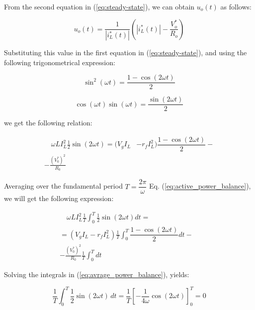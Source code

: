 \documentclass[DIV=calc, paper=a4, fontsize=11pt, twocolumn]{scrartcl}	 %
\begin{document}
From the second equation in (\ref{eq:steady-state}), we can obtain $u_o(t)$ as follows:

{\small
\begin{equation} \label{eq:steady_state_control}
u_o(t)= \dfrac{1}{|i^*_L(t)|}(|i^*_L(t)|- \dfrac{V^*_{o}}{R_o})
\end{equation}
}


Substituting this value in the first equation in (\ref{eq:steady-state}), and using the following trigonometrical expression:

\begin{equation}\label{eq:sin2wt}
\sin^2(\omega t) = \dfrac{1-\cos(2\omega t)}{2}
\end{equation}

\begin{equation}\label{eq:cossin}
\cos(\omega t)\sin(\omega t) = \dfrac{\sin(2\omega t)}{2}
\end{equation}

we get the following relation:

{\small
\begin{equation}\label{eq:active_power_balance}
\begin{split}
\quad \omega L I_L^2 \frac{1}{2} \sin(2\omega t) = (V_g I_L&-r_f I_L^2 ) \dfrac{1-\cos(2\omega t)}{2} - \\ - \frac{(V_0^*)^2}{R_0} 
\end{split}
\end{equation}
}

Averaging over the fundamental period $T=\dfrac{2\pi}{\omega}$ Eq. (\ref{eq:active_power_balance}), we will get the following expression:

{\small
\begin{equation}\label{eq:avrage_power_balance}
\begin{split}
\quad \omega L I_L^2\frac{1}{T}\int_{0}^T{\frac{1}{2} \sin(2\omega t) dt}=\\
= (V_g I_L-r_f I_L^2 ) \frac{1}{T}\int_{0}^T{\dfrac{1-\cos(2\omega t)}{2} dt}- &\\ - \frac{(V_0^*)^2}{R_0} \frac{1}{T}\int_{0}^T{dt}
\end{split}
\end{equation}
}

Solving the integrals in (\ref{eq:avrage_power_balance}), yields:


\begin{equation}\label{eq:integral sin}
\frac{1}{T}\int_{0}^{T} \frac{1}{2} \sin(2\omega t) \, dt = \frac{1}{T}\left[ -\frac{1}{4\omega} \cos(2\omega t) \right]_{0}^{T}= 0
\end{equation}
\end{document}
